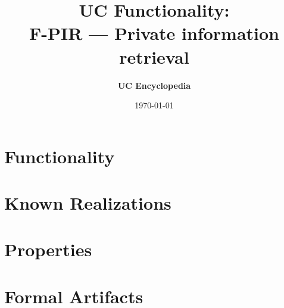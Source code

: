 \documentclass[11pt,a4paper]{article}
\title{\textbf{\Large UC Functionality:}\\[0.2em] \Large F-PIR --- Private information retrieval}
\author{\textbf{UC Encyclopedia}}
\date{\today}
\newtheorem{functionality}{Functionality}
\begin{document}
\maketitle

\begin{abstract}
\end{abstract}

\section{Functionality}

%

\section{Known Realizations}


\section{Properties}


\section{Formal Artifacts}

\end{document}

